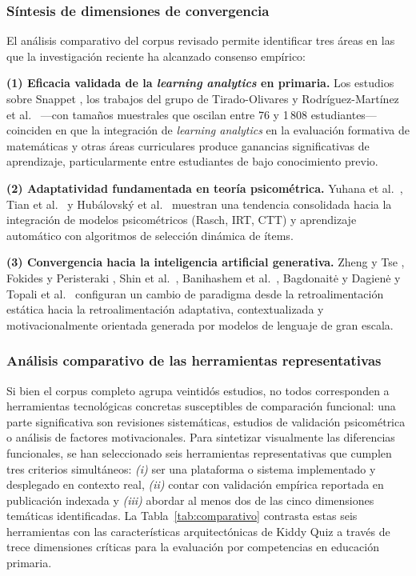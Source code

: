 \subsubsection{Síntesis de dimensiones de convergencia}

El análisis comparativo del corpus revisado permite identificar tres áreas en las que la investigación reciente ha alcanzado consenso empírico:

\textbf{(1) Eficacia validada de la \textit{learning analytics} en primaria.} Los estudios sobre Snappet \cite{faber2017dfa,molenaar2016snappet}, los trabajos del grupo de Tirado-Olivares \cite{tirado2024analytics,tirado2024lms,tirado2025bridge} y Rodríguez-Martínez et al.\ \cite{rodriguez2023personalised} ---con tamaños muestrales que oscilan entre 76 y 1\,808 estudiantes--- coinciden en que la integración de \textit{learning analytics} en la evaluación formativa de matemáticas y otras áreas curriculares produce ganancias significativas de aprendizaje, particularmente entre estudiantes de bajo conocimiento previo.

\textbf{(2) Adaptatividad fundamentada en teoría psicométrica.} Yuhana et al.\ \cite{yuhana2024adaptive}, Tian et al.\ \cite{tian2025intelligent} y Hubálovský et al.\ \cite{hubalovsky2019adaptive} muestran una tendencia consolidada hacia la integración de modelos psicométricos (Rasch, IRT, CTT) y aprendizaje automático con algoritmos de selección dinámica de ítems.

\textbf{(3) Convergencia hacia la inteligencia artificial generativa.} Zheng y Tse \cite{zheng2023genai}, Fokides y Peristeraki \cite{fokides2025chatgpt}, Shin et al.\ \cite{shin2025aigenerated}, Banihashem et al.\ \cite{banihashem2025aimapping}, Bagdonaitė y Dagienė \cite{bagdonaite2025ai} y Topali et al.\ \cite{topali2025aied} configuran un cambio de paradigma desde la retroalimentación estática hacia la retroalimentación adaptativa, contextualizada y motivacionalmente orientada generada por modelos de lenguaje de gran escala.

\subsubsection{Análisis comparativo de las herramientas representativas}

Si bien el corpus completo agrupa veintidós estudios, no todos corresponden a herramientas tecnológicas concretas susceptibles de comparación funcional: una parte significativa son revisiones sistemáticas, estudios de validación psicométrica o análisis de factores motivacionales. Para sintetizar visualmente las diferencias funcionales, se han seleccionado seis herramientas representativas que cumplen tres criterios simultáneos: \textit{(i)} ser una plataforma o sistema implementado y desplegado en contexto real, \textit{(ii)} contar con validación empírica reportada en publicación indexada y \textit{(iii)} abordar al menos dos de las cinco dimensiones temáticas identificadas. La Tabla~\ref{tab:comparativo} contrasta estas seis herramientas con las características arquitectónicas de Kiddy Quiz a través de trece dimensiones críticas para la evaluación por competencias en educación primaria.

